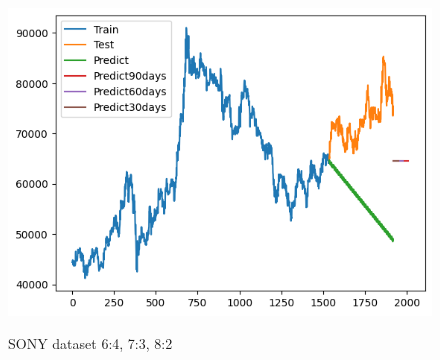 \documentclass[conference]{IEEEtran}
\begin{document}
\begin{figure}[H]
\begin{minipage}{0.15\textwidth}
    \label{fig:2}
    \end{minipage}%
    \begin{minipage}{0.15\textwidth}
    \centering
    \includegraphics[width=1\textwidth]{Image/ARIMA/SAMSUNG_8_2_Arima.png}

    \label{fig:3}
    \end{minipage}
    \caption{SONY dataset 6:4, 7:3, 8:2 }
\end{figure}
\end{document}
